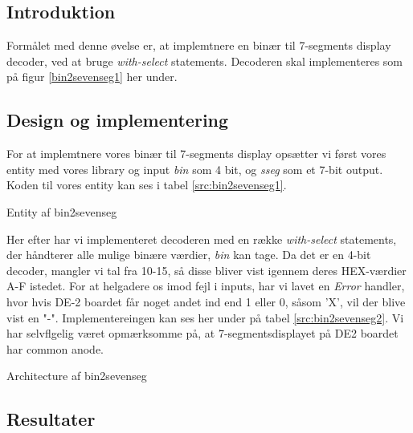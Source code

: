 \documentclass[../journal2.tex]{subfiles}
\begin{document}
\subsection{Introduktion}

Formålet med denne øvelse er, at implemtnere en binær til 7-segments display decoder, ved at bruge \textit{with-select} statements. Decoderen skal implementeres som på figur \ref{bin2sevenseg1} her under.


\subsection{Design og implementering}

For at implemtnere vores binær til 7-segments display opsætter vi først vores entity med vores library og input \textit{bin} som 4 bit, og \textit{sseg} som et 7-bit output. Koden til vores entity kan ses i tabel \ref{src:bin2sevenseg1}.

\begin{table}[!hbt]
  \centering
    \framebox{
      \rule{8pt}{0pt}
        
}
\caption{Entity af bin2sevenseg}
\label{src:bin2sevenseg1}
\end{table}

Her efter har vi implementeret decoderen med en række \textit{with-select} statements, der håndterer alle mulige binære værdier, \textit{bin} kan tage. Da det er en 4-bit decoder, mangler vi tal fra 10-15, så disse bliver vist igennem deres HEX-værdier A-F istedet. For at helgadere os imod fejl i inputs, har vi lavet en \textit{Error} handler, hvor hvis DE-2 boardet får noget andet ind end 1 eller 0, såsom 'X', vil der blive vist en "-". Implementereingen kan ses her under på tabel \ref{src:bin2sevenseg2}. Vi har selvflgelig været opmærksomme på, at 7-segmentsdisplayet på DE2 boardet har common anode.

\begin{table}[H]
    \centering
      \framebox{
        \rule{8pt}{0pt}
          
  }
  \caption{Architecture af bin2sevenseg}
  \label{src:bin2sevenseg2}
\end{table}

\subsection{Resultater}
\end{document}
